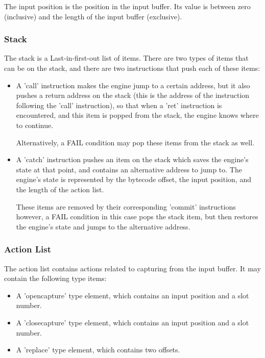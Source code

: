 The input position is the position in the input buffer. Its value
is between zero (inclusive) and the length of the input buffer (exclusive).

\subsubsection{Stack}

The stack is a Last-in-first-out list of items. There are two types
of items that can be on the stack, and there are two instructions that
push each of these items:

\begin{itemize}

\item A 'call' instruction makes the engine jump to a certain address,
but it also pushes a return address on the stack
(this is the address of the instruction following the 'call' instruction),
so that when a 'ret' instruction is encountered,
and this item is popped from the stack, the engine knows where to continue.

Alternatively, a FAIL condition may pop these items from the stack as well.

\item A 'catch' instruction pushes an item on the stack which saves the
engine's state at that point, and contains an alternative address to jump
to. The engine's state is represented by the bytecode offset, the input
position, and the length of the action list.

These items are removed by their corresponding 'commit' instructions however,
a FAIL condition in this case pops the stack item, but then restores the
engine's state and jumps to the alternative address.

\end{itemize}

\subsubsection{Action List}

The action list contains actions related to capturing from the input buffer.
It may contain the following type items:

\begin{itemize}

\item A 'opencapture' type element, which contains an input position
      and a slot number.
\item A 'closecapture' type element, which contains an input position
      and a slot number.
\item A 'replace' type element, which contains two offsets.

\end{itemize}

